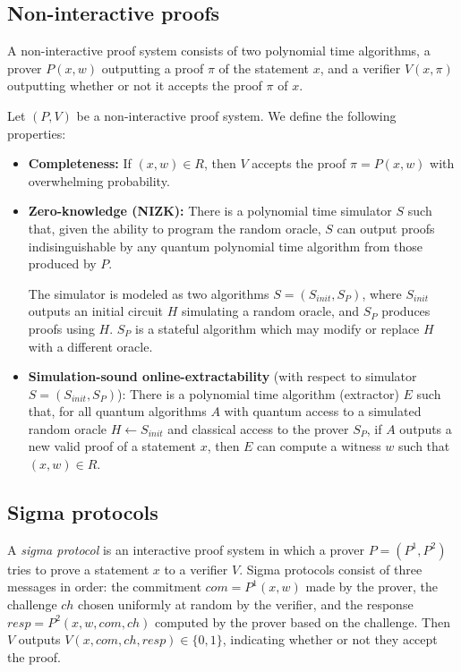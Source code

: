 \documentclass{amsart}
\theoremstyle{plain}
\theoremstyle{remark}
\numberwithin{equation}{section}
\begin{document}
\subsection{Non-interactive proofs}
A non-interactive proof system consists of two polynomial time algorithms, a prover $P(x,w)$ outputting a proof $\pi$ of the statement $x$, and a verifier $V(x,\pi)$ outputting whether or not it accepts the proof $\pi$ of $x$.

Let $(P,V)$ be a non-interactive proof system. We define the following properties:
\begin{itemize}
	\item 
	{\bf Completeness:} If $(x,w) \in R$, then $V$ accepts the proof $\pi = P(x,w)$ with overwhelming probability.

	\item
	{\bf Zero-knowledge (NIZK):} There is a polynomial time simulator $S$ such that, given the ability to program the random oracle, $S$ can output proofs indisinguishable by any quantum polynomial time algorithm from those produced by $P$. 

	The simulator is modeled as two algorithms $S = (S_{init}, S_P)$, where $S_{init}$ outputs an initial circuit $H$ simulating a random oracle, and $S_P$ produces proofs using $H$. $S_P$ is a stateful algorithm which may modify or replace $H$ with a different oracle.

	\item
	{\bf Simulation-sound online-extractability} (with respect to simulator $S = (S_{init}, S_P)$): There is a polynomial time algorithm (extractor) $E$ such that, for all quantum algorithms $A$ with quantum access to a simulated random oracle $H \leftarrow S_{init}$ and classical access to the prover $S_P$, if $A$ outputs a new valid proof of a statement $x$, then $E$ can compute a witness $w$ such that $(x,w) \in R$.
\end{itemize}



\subsection{Sigma protocols} 
A \emph{sigma protocol} is an interactive proof system in which a prover $P=(P^1,P^2)$ tries to prove a statement $x$ to a verifier $V$. Sigma protocols consist of three messages in order: the commitment $com = P^1(x,w)$ made by the prover, the challenge $ch$ chosen uniformly at random by the verifier, and the response $resp = P^2(x,w,com,ch)$ computed by the prover based on the challenge. Then $V$ outputs $V(x,com,ch,resp) \in \{0,1\}$, indicating whether or not they accept the proof.
\end{document}
